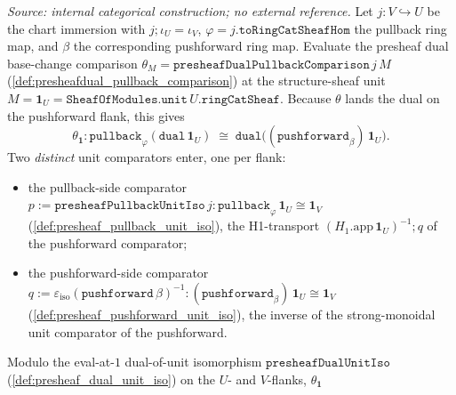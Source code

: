 \begin{lemma}


  \label{lem:presheafdualunitiso_pullback_natural}
  \textit{Source: internal categorical construction; no external reference.}
  Let \(j : V \hookrightarrow U\) be the chart immersion with \(j \mathbin{;} \iota_U = \iota_V\),
  \(\varphi = j.\mathtt{toRingCatSheafHom}\) the pullback ring map, and \(\beta\) the corresponding
  pushforward ring map. Evaluate the presheaf dual base-change comparison
  \(\theta_M = \mathtt{presheafDualPullbackComparison}\,j\,M\)
  (\cref{def:presheafdual_pullback_comparison}) at the structure-sheaf unit
  \(M = \mathbf 1_U = \mathtt{SheafOfModules.unit}\,U.\mathtt{ringCatSheaf}\). Because \(\theta\) lands
  the dual on the pushforward flank, this gives
  \[
    \theta_{\mathbf 1} : \mathtt{pullback}_\varphi(\mathtt{dual}\,\mathbf 1_U)
      \;\cong\; \mathtt{dual}\bigl((\mathtt{pushforward}_\beta)\,\mathbf 1_U\bigr).
  \]
  Two \emph{distinct} unit comparators enter, one per flank:
  \begin{itemize}
    \item the pullback-side comparator
      \(p := \mathtt{presheafPullbackUnitIso}\,j : \mathtt{pullback}_\varphi\,\mathbf 1_U \cong \mathbf 1_V\)
      (\cref{def:presheaf_pullback_unit_iso}), the H1-transport \((H_1.\mathrm{app}\,\mathbf 1_U)^{-1}
      \mathbin{;} q\) of the pushforward comparator;
    \item the pushforward-side comparator
      \(q := \varepsilon_{\mathrm{iso}}(\mathtt{pushforward}\,\beta)^{-1} :
        (\mathtt{pushforward}_\beta)\,\mathbf 1_U \cong \mathbf 1_V\)
      (\cref{def:presheaf_pushforward_unit_iso}), the inverse of the strong-monoidal unit comparator
      of the pushforward.
  \end{itemize}
  Modulo the eval-at-\(1\) dual-of-unit isomorphism \(\mathtt{presheafDualUnitIso}\)
  (\cref{def:presheaf_dual_unit_iso}) on the \(U\)- and \(V\)-flanks, \(\theta_{\mathbf 1}\)

\end{lemma}
